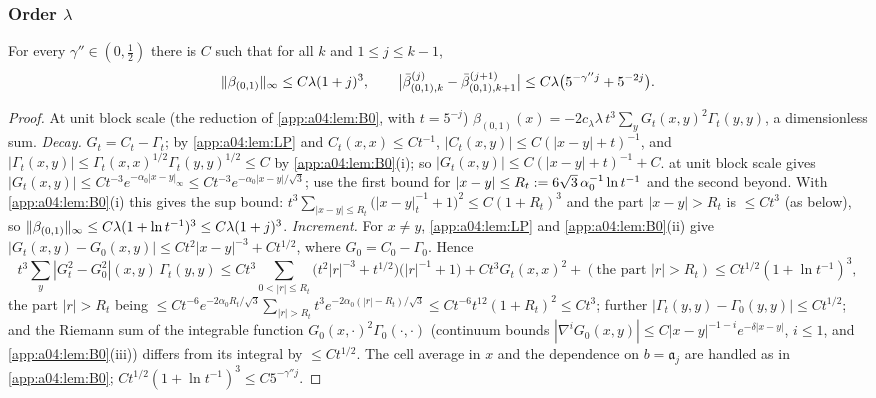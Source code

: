 \subsubsection{Order \texorpdfstring{$\lambda$}{lambda}}

\begin{lemma}\label{app:a04:lem:B1}
For every $\gamma''\in(0,\frac12)$ there is $C$ such that for all $k$ and $1\le j\le k-1$,
\[
\lVert \beta_{(0,1)}\rVert_\infty\le C\lambda(1+j)^3,\qquad\big|\bar\beta^{(j)}_{(0,1),k}-\bar\beta^{(j+1)}_{(0,1),k+1}\big|\le C\lambda\big(5^{-\gamma''j}+5^{-2j}\big).
\]
\end{lemma}
\begin{proof}
At unit block scale (the reduction of \cref{app:a04:lem:B0}, with $t=5^{-j}$) $\beta_{(0,1)}(x)=-2c_\lambda\lambda\,t^3\sum_yG_t(x,y)^2\Gamma_t(y,y)$, a dimensionless sum. \emph{Decay.} $G_t=C_t-\Gamma_t$; by \cref{app:a04:lem:LP} and $C_t(x,x)\le Ct^{-1}$, $|C_t(x,y)|\le C(|x-y|+t)^{-1}$, and $|\Gamma_t(x,y)|\le\Gamma_t(x,x)^{1/2}\Gamma_t(y,y)^{1/2}\le C$ by \cref{app:a04:lem:B0}(i); so $|G_t(x,y)|\le C(|x-y|+t)^{-1}+C$.  at unit block scale gives $|G_t(x,y)|\le Ct^{-3}e^{-\alpha_0|x-y|_\infty}\le Ct^{-3}e^{-\alpha_0|x-y|/\sqrt3}$; use the first bound for $|x-y|\le R_t:=6\sqrt3\,\alpha_0^{-1}\ln t^{-1}$ and the second beyond. With \cref{app:a04:lem:B0}(i) this gives the sup bound: $t^3\sum_{|x-y|\le R_t}\big(|x-y|_t^{-1}+1\big)^2\le C(1+R_t)^3$ and the part $|x-y|>R_t$ is $\le Ct^3$ (as below), so $\lVert \beta_{(0,1)}\rVert_\infty\le C\lambda(1+\ln t^{-1})^3\le C\lambda(1+j)^3$. \emph{Increment.} For $x\ne y$, \cref{app:a04:lem:LP} and \cref{app:a04:lem:B0}(ii) give $|G_t(x,y)-G_0(x,y)|\le Ct^2|x-y|^{-3}+Ct^{1/2}$, where $G_0=C_0-\Gamma_0$. Hence
\[
t^3\sum_y|G_t^2-G_0^2|(x,y)\,\Gamma_t(y,y)\le Ct^3\!\!\sum_{0<|r|\le R_t}\!\!\big(t^2|r|^{-3}+t^{1/2}\big)\big(|r|^{-1}+1\big)+Ct^3G_t(x,x)^2+(\text{the part }|r|>R_t)\le Ct^{1/2}(1+\ln t^{-1})^3,
\]
the part $|r|>R_t$ being $\le Ct^{-6}e^{-2\alpha_0R_t/\sqrt3}\sum_{|r|>R_t}t^3e^{-2\alpha_0(|r|-R_t)/\sqrt3}\le Ct^{-6}t^{12}(1+R_t)^2\le Ct^{3}$; further $|\Gamma_t(y,y)-\Gamma_0(y,y)|\le Ct^{1/2}$; and the Riemann sum of the integrable function $G_0(x,\cdot)^2\Gamma_0(\cdot,\cdot)$ (continuum bounds $|\nabla^iG_0(x,y)|\le C|x-y|^{-1-i}e^{-\delta|x-y|}$, $i\le1$, and \cref{app:a04:lem:B0}(iii)) differs from its integral by $\le Ct^{1/2}$. The cell average in $x$ and the dependence on $b=\mathfrak a_j$ are handled as in \cref{app:a04:lem:B0}; $Ct^{1/2}(1+\ln t^{-1})^3\le C5^{-\gamma''j}$.
\end{proof}

